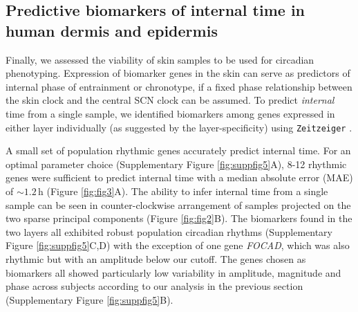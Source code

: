 
\subsection*{Predictive biomarkers of internal time in human dermis and epidermis}
Finally, we assessed the viability of skin samples to be used for circadian phenotyping. Expression of biomarker genes in the skin can serve as predictors of internal phase of entrainment or chronotype, if a fixed phase relationship between the skin clock and the central SCN clock can be assumed. To predict \textit{internal} time from a single sample, we identified biomarkers among genes expressed in either layer individually (as suggested by the layer-specificity) using \texttt{Zeitzeiger} \cite{Hughey2016}.

A small set of population rhythmic genes accurately predict internal time. For an optimal parameter choice (Supplementary Figure \ref{fig:suppfig5}A), 8-12 rhythmic genes were sufficient to predict internal time with a median absolute error (MAE) of $\sim 1.2$\,h (Figure \ref{fig:fig3}A). The ability to infer internal time from a single sample can be seen in counter-clockwise arrangement of samples projected on the two sparse principal components (Figure \ref{fig:fig2}B). The biomarkers found in the two layers all exhibited robust population circadian rhythms (Supplementary Figure \ref{fig:suppfig5}C,D) with the exception of one gene \textit{FOCAD}, which was also rhythmic but with an amplitude below our cutoff. The genes chosen as biomarkers all showed particularly low variability in amplitude, magnitude and phase across subjects according to our analysis in the previous section (Supplementary Figure \ref{fig:suppfig5}B).

